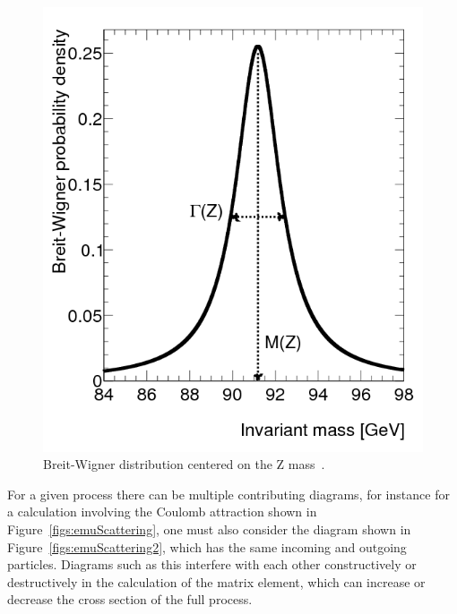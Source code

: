 \begin{figure}
\begin{center}
\includegraphics[width=1.0\linewidth]{figs/BrWig.png}
\caption{Breit-Wigner distribution centered on the Z mass~\cite{Ocariz:1701936}.}
\label{figs:BrWig}
\end{center}
\end{figure}




For a given process there can be multiple contributing diagrams, for instance for a calculation involving the Coulomb attraction shown in Figure~\ref{figs:emuScattering}, 
one must also consider the 
diagram shown in Figure~\ref{figs:emuScattering2}, which has the same incoming and outgoing particles.  
Diagrams such as this interfere with each other constructively or destructively in the calculation of the matrix element, 
which can increase or decrease the cross section of the full process.  

